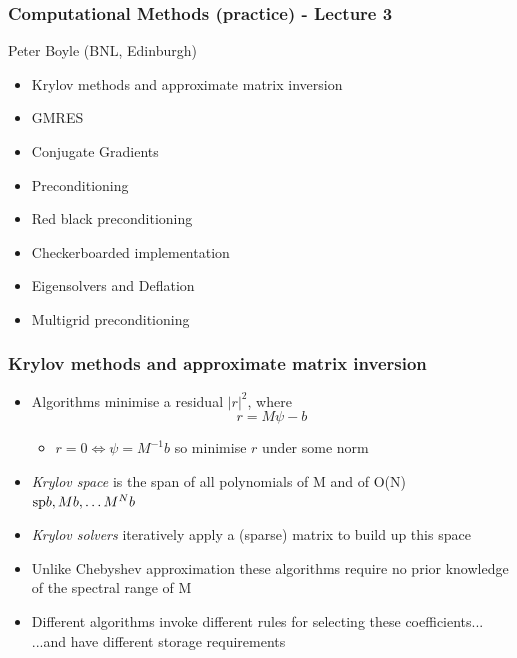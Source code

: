 \documentclass[pdf,ps,8pt]{beamer}
\begin{document}
\begin{frame}[fragile]\small\frametitle{  Computational Methods (practice) -  Lecture 3    }

  \begin{center}
 
  {\color{red} Peter Boyle} (BNL, Edinburgh)

  \begin{itemize}
  \item Krylov methods and approximate matrix inversion
  \item GMRES
  \item Conjugate Gradients
  \item Preconditioning
  \item Red black preconditioning
  \item Checkerboarded implementation
  \item Eigensolvers and Deflation
  \item Multigrid preconditioning
  \end{itemize}

\end{center}  
\end{frame}

  \begin{frame}[fragile]\small\frametitle{ Krylov methods and approximate matrix inversion}
  \begin{itemize}
  \item Algorithms minimise a residual $|r|^2$, where
    $$
    r = M \psi - b
    $$
  \begin{itemize}
  \item $r=0 \Leftrightarrow \psi = M^{-1} b$ so minimise $r$ under some norm
  \end{itemize}
  \item \emph{Krylov space} is the span of all polynomials of M and of O(N) $ {\rm sp} { b , M b, \ldots M^N b}$
  \item \emph{Krylov solvers} iteratively apply a (sparse) matrix to build up this space
  \item Unlike Chebyshev approximation these algorithms require no prior knowledge of the spectral range of M
  \item Different algorithms invoke different rules for selecting these coefficients...\\ ...and have different storage requirements
  \end{itemize}
  \end{frame}
\end{document}
